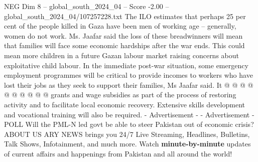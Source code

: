 \begin{textsample}{NEG Dim 8 – global\_south\_2024\_04 – Score -2.00 – global\_south\_2024\_04/107257228.txt}
The ILO estimates that perhaps 25 per cent of the people killed in Gaza have been men of working age -- generally, women do not work.
Ms.
Jaafar said the loss of these breadwinners will mean that families will face some economic hardships after the war ends.
This could mean more children in a future Gazan labour market raising concerns about exploitative child labour.
In the immediate post-war situation, some emergency employment programmes will be critical to provide incomes to workers who have lost their jobs as they seek to support their families, Ms Jaafar said.
It @ @ @ @ @ @ @ @ @ @ grants and wage subsidies as part of the process of restoring activity and to facilitate local economic recovery.
Extensive skills development and vocational training will also be required. - Advertisement - - Advertisement - POLL Will the PML-N led govt be able to steer Pakistan out of economic crisis?
ABOUT US ARY NEWS brings you 24/7 Live Streaming, Headlines, Bulletins, Talk Shows, Infotainment, and much more.
Watch \textbf{minute-by-minute} updates of current affairs and happenings from Pakistan and all around the world!

\end{textsample}
